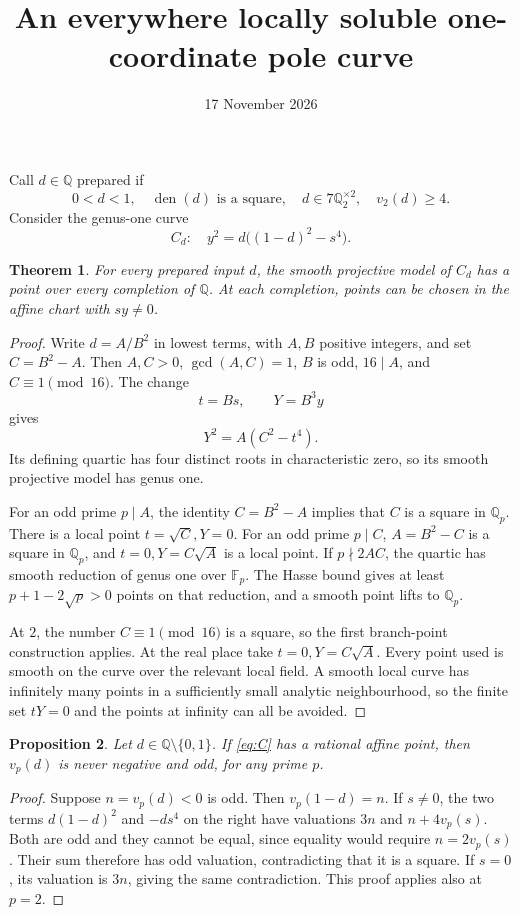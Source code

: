 \documentclass[11pt]{article}
\newtheorem{theorem}{Theorem}
\newtheorem{proposition}[theorem]{Proposition}
\newcommand{\Q}{\mathbb Q}
\begin{document}
\title{An everywhere locally soluble one-coordinate pole curve}
\author{}\date{17 November 2026}\maketitle
Call $d\in\Q$ prepared if
\[
 0<d<1,\quad \operatorname{den}(d)\text{ is a square},\quad
 d\in7\Q_2^{\times2},\quad v_2(d)\ge4.
\]
Consider the genus-one curve
\begin{equation}\label{eq:C}
 C_d:\quad y^2=d\bigl((1-d)^2-s^4\bigr).
\end{equation}

\begin{theorem}\label{thm:local}
For every prepared input $d$, the smooth projective model of $C_d$ has a point over every completion of $\Q$. At each completion, points can be chosen in the affine chart with $sy\ne0$.
\end{theorem}
\begin{proof}
Write $d=A/B^2$ in lowest terms, with $A,B$ positive integers, and set $C=B^2-A$. Then $A,C>0$, $\gcd(A,C)=1$, $B$ is odd, $16\mid A$, and $C\equiv1\pmod{16}$. The change
\[
 t=Bs,\qquad Y=B^3y
\]
gives
\begin{equation}\label{eq:integral}
 Y^2=A(C^2-t^4).
\end{equation}
Its defining quartic has four distinct roots in characteristic zero, so its smooth projective model has genus one.

For an odd prime $p\mid A$, the identity $C=B^2-A$ implies that $C$ is a square in $\Q_p$. There is a local point $t=\sqrt C,Y=0$. For an odd prime $p\mid C$, $A=B^2-C$ is a square in $\Q_p$, and $t=0,Y=C\sqrt A$ is a local point. If $p\nmid2AC$, the quartic has smooth reduction of genus one over $\mathbb F_p$. The Hasse bound gives at least $p+1-2\sqrt p>0$ points on that reduction, and a smooth point lifts to $\Q_p$.

At $2$, the number $C\equiv1\pmod{16}$ is a square, so the first branch-point construction applies. At the real place take $t=0,Y=C\sqrt A$. Every point used is smooth on the curve over the relevant local field. A smooth local curve has infinitely many points in a sufficiently small analytic neighbourhood, so the finite set $tY=0$ and the points at infinity can all be avoided.
\end{proof}

\begin{proposition}\label{prop:sound}
Let $d\in\Q\setminus\{0,1\}$. If \eqref{eq:C} has a rational affine point, then $v_p(d)$ is never negative and odd, for any prime $p$.
\end{proposition}
\begin{proof}
Suppose $n=v_p(d)<0$ is odd. Then $v_p(1-d)=n$. If $s\ne0$, the two terms $d(1-d)^2$ and $-ds^4$ on the right have valuations $3n$ and $n+4v_p(s)$. Both are odd and they cannot be equal, since equality would require $n=2v_p(s)$. Their sum therefore has odd valuation, contradicting that it is a square. If $s=0$, its valuation is $3n$, giving the same contradiction. This proof applies also at $p=2$.
\end{proof}
\end{document}
